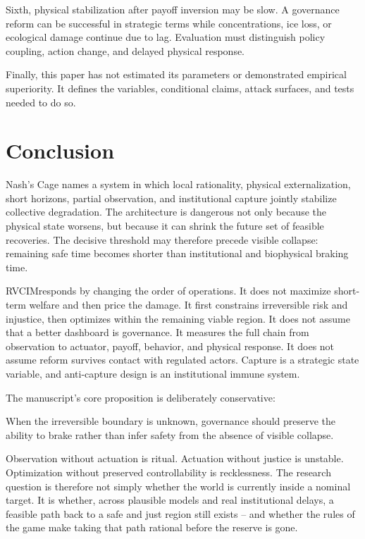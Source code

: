 \documentclass[11pt,a4paper]{article}
\numberwithin{equation}{section}
\theoremstyle{definition}
\theoremstyle{plain}
\theoremstyle{remark}
\newcommand{\RVCIM}{\textsc{RVCIM}}
\begin{document}
Sixth, physical stabilization after payoff inversion may be slow. A governance reform can be successful in strategic terms while concentrations, ice loss, or ecological damage continue due to lag. Evaluation must distinguish policy coupling, action change, and delayed physical response.

Finally, this paper has not estimated its parameters or demonstrated empirical superiority. It defines the variables, conditional claims, attack surfaces, and tests needed to do so.

\section{Conclusion}

Nash's Cage names a system in which local rationality, physical externalization, short horizons, partial observation, and institutional capture jointly stabilize collective degradation. The architecture is dangerous not only because the physical state worsens, but because it can shrink the future set of feasible recoveries. The decisive threshold may therefore precede visible collapse: remaining safe time becomes shorter than institutional and biophysical braking time.

\RVCIM responds by changing the order of operations. It does not maximize short-term welfare and then price the damage. It first constrains irreversible risk and injustice, then optimizes within the remaining viable region. It does not assume that a better dashboard is governance. It measures the full chain from observation to actuator, payoff, behavior, and physical response. It does not assume reform survives contact with regulated actors. Capture is a strategic state variable, and anti-capture design is an institutional immune system.

The manuscript's core proposition is deliberately conservative:
\begin{corebox}
When the irreversible boundary is unknown, governance should preserve the ability to brake rather than infer safety from the absence of visible collapse.
\end{corebox}

Observation without actuation is ritual. Actuation without justice is unstable. Optimization without preserved controllability is recklessness. The research question is therefore not simply whether the world is currently inside a nominal target. It is whether, across plausible models and real institutional delays, a feasible path back to a safe and just region still exists -- and whether the rules of the game make taking that path rational before the reserve is gone.
\end{document}
